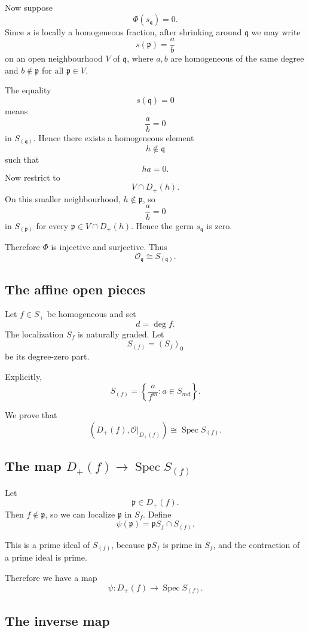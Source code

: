 \documentclass[12pt,a4paper]{article}
\DeclareMathOperator{\Spec}{Spec}
\theoremstyle{notespace}
\begin{document}
Now suppose
\[
\Phi(s_{\mathfrak q})=0.
\]
Since \(s\) is locally a homogeneous fraction, after shrinking around \(\mathfrak q\) we may
write
\[
s(\mathfrak p)=\frac{a}{b}
\]
on an open neighbourhood \(V\) of \(\mathfrak q\), where \(a,b\) are homogeneous of the
same degree and \(b\notin\mathfrak p\) for all \(\mathfrak p\in V\).

The equality
\[
s(\mathfrak q)=0
\]
means
\[
\frac{a}{b}=0
\]
in \(S_{(\mathfrak q)}\). Hence there exists a homogeneous element
\[
h\notin \mathfrak q
\]
such that
\[
ha=0.
\]
Now restrict to
\[
V\cap D_+(h).
\]
On this smaller neighbourhood, \(h\notin \mathfrak p\), so
\[
\frac{a}{b}=0
\]
in \(S_{(\mathfrak p)}\) for every \(\mathfrak p\in V\cap D_+(h)\). Hence the germ
\(s_{\mathfrak q}\) is zero.

Therefore \(\Phi\) is injective and surjective. Thus
\[
\boxed{
	\mathcal O_{\mathfrak q}\cong S_{(\mathfrak q)}.
}
\]

\subsection{The affine open pieces}

Let \(f\in S_+\) be homogeneous and set
\[
d=\deg f.
\]
The localization \(S_f\) is naturally graded. Let
\[
S_{(f)}
=
(S_f)_0
\]
be its degree-zero part.

Explicitly,
\[
S_{(f)}
=
\left\{
\frac{a}{f^m} :
a\in S_{md}
\right\}.
\]

We prove that
\[
\left(D_+(f),\mathcal O|_{D_+(f)}\right)
\cong
\Spec S_{(f)}.
\]

\subsection{The map \texorpdfstring{$D_+(f)\to \Spec S_{(f)}$}{D+(f) to Spec S(f)}}

Let
\[
\mathfrak p\in D_+(f).
\]
Then \(f\notin \mathfrak p\), so we can localize \(\mathfrak p\) in \(S_f\). Define
\[
\psi(\mathfrak p)
=
\mathfrak pS_f\cap S_{(f)}.
\]

This is a prime ideal of \(S_{(f)}\), because \(\mathfrak pS_f\) is prime in \(S_f\), and
the contraction of a prime ideal is prime.

Therefore we have a map
\[
\psi:D_+(f)\longrightarrow \Spec S_{(f)}.
\]

\subsection{The inverse map}
\end{document}
